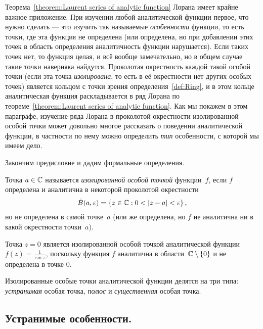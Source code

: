 \documentclass[../complex-analysis.tex]{subfiles}
\begin{document}
Теорема~\ref{theorem:Laurent series of analytic function} Лорана имеет крайне важное приложение. При изучении любой аналитической функции первое, что нужно сделать --- это изучить так называемые \emph{особенности} функции, то есть точки, где эта функция не определена (или определена, но при добавлении этих точек в область определения аналитичность функции нарушается). Если таких точек нет, то функция целая, и всё вообще замечательно, но в общем случае такие точки наверняка найдутся. Проколотая окрестность каждой такой особой точки (если эта точка \emph{изолирована}, то есть в её окрестности нет других особых точек) является кольцом с точки зрения определения~\ref{def:Ring}, и в этом кольце аналитическая функция раскладывается в ряд Лорана по теореме~\ref{theorem:Laurent series of analytic function}. Как мы покажем в этом параграфе, изучение ряда Лорана в проколотой окрестности изолированной особой точки может довольно многое рассказать о поведении аналитической функции, в частности по нему можно определить \emph{тип} особенности, с которой мы имеем дело.

Закончим предисловие и дадим формальные определения.

\begin{df}
 Точка $ a \in \mathbb{C} $ называется \textit{изолированной особой точкой} функции~$ f $, если $ f $ определена и аналитична в некоторой проколотой окрестности
 \begin{align*}
  \dot B(a, \varepsilon) = \left\{z\in\mathbb{C} : 0 < \left| z-a \right| < \varepsilon\right\},
 \end{align*} но не определена в самой точке~$ a $ (или же определена, но $ f $ не аналитична ни в какой окрестности точки~$ a $).
\end{df}
\begin{exmpl}
 Точка $ z = 0 $ является изолированной особой точкой аналитической функции $ f(z) = \frac{1}{\sin z} $, поскольку функция $ f $ аналитична в области~$ \mathbb{C} \setminus \left\{ 0 \right\} $ и не определена в точке $ 0 $.
\end{exmpl}

Изолированные особые точки аналитической функции делятся на три типа: \emph{устранимая} особая точка, \emph{полюс} и \emph{существенная} особая точка.

\subsection{Устранимые особенности.}
\end{document}
